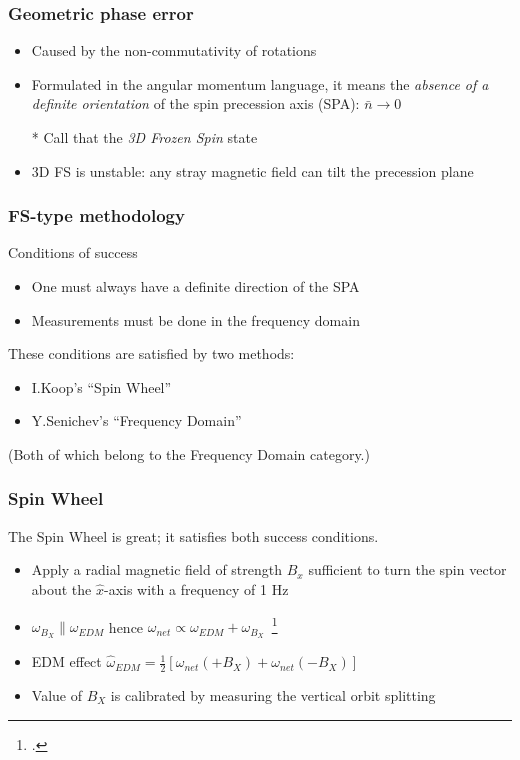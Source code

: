 \documentclass{beamer}
\newcommand{\w}{\omega}
\newcommand{\nbar}{\bar n}
\begin{document}
\begin{frame}\frametitle{Geometric phase error}
  \begin{itemize}
  \item Caused by the non-commutativity of rotations
  \item Formulated in the angular momentum language, it means the \emph{absence of a definite orientation} of
    the spin precession axis (SPA): $\nbar \rightarrow 0$
  \item[*] Call that the \emph{3D Frozen Spin} state
    \item 3D FS is unstable: any stray magnetic field can tilt the precession plane
  \end{itemize}
\end{frame}

\begin{frame}\frametitle{FS-type methodology}
  \begin{block}{Conditions of success}
    \begin{itemize}
    \item One must always have a definite direction of the SPA
    \item Measurements must be done in the frequency domain
    \end{itemize}
  \end{block}
  These conditions are satisfied by two methods:
  \begin{itemize}
  \item I.Koop's ``Spin Wheel''
  \item Y.Senichev's ``Frequency Domain''
  \end{itemize}
  (Both of which belong to the Frequency Domain category.)
\end{frame}

\begin{frame}\frametitle{Spin Wheel}
  \begin{block}{}
    The Spin Wheel is great; it satisfies both success conditions.
  \end{block}
  \begin{itemize}
  \item Apply a radial magnetic field of strength $B_x$ sufficient to turn the spin vector about
    the $\hat x$-axis with a frequency of 1 Hz
  \item $\w_{B_X} \parallel \w_{EDM}$ hence $\w_{net} \propto \w_{EDM} + \w_{B_X}$~\footcite[p.~6]{Mane:SpinWheel}
  \item EDM effect $\hat\w_{EDM} = \frac12\left[\w_{net}(+B_X) + \w_{net}(-B_X)\right]$
  \item Value of $B_X$ is calibrated by measuring the vertical orbit splitting
  \end{itemize}
\end{frame}
\end{document}

